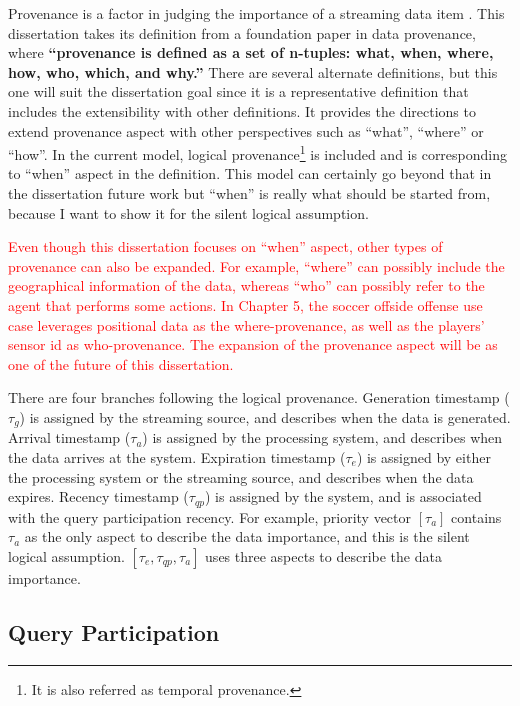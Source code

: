 Provenance is a factor in judging the importance of a streaming data item \cite{gao2010survey}.
This dissertation takes its definition from a foundation paper \cite{ram2009new} in data provenance, 
where \textbf{``provenance is defined as a set of n-tuples: what, when, where, how, who, which, and why.''}
There are several alternate definitions, but this one will suit the dissertation goal since it is a representative definition that includes the extensibility with other definitions. 
It provides the directions to extend provenance aspect with other perspectives such as ``what'', ``where'' or ``how''. 
In the current model, logical provenance\footnote{It is also referred as temporal provenance.} is included and is corresponding to ``when'' aspect in the definition.
This model can certainly go beyond that in the dissertation future work but ``when'' is really what should be started from, because I want to show it for the silent logical assumption.

\textcolor{red}{
Even though this dissertation focuses on ``when'' aspect, other types of provenance can also be expanded. 
For example, ``where'' can possibly include the geographical information of the data, whereas ``who'' can possibly refer to the agent that performs some actions. 
In Chapter 5, the soccer offside offense use case leverages positional data as the where-provenance, as well as the players' sensor id as who-provenance. 
The expansion of the provenance aspect will be as one of the future of this dissertation.}

There are four branches following the logical provenance.
Generation timestamp ($\tau_{g}$) is assigned by the streaming source, and describes when the data is generated.
Arrival timestamp ($\tau_{a}$) is assigned by the processing system, and describes when the data arrives at the system.
Expiration timestamp ($\tau_{e}$) is assigned by either the processing system or the streaming source, and describes when the data expires.
Recency timestamp ($\tau_{qp}$) is assigned by the system, and is associated with the query participation recency.
For example, priority vector $[\tau_{a}]$ contains $\tau_{a}$ as the only aspect to describe the data importance, and this is the silent logical assumption.
$[\tau_{e}, \tau_{qp}, \tau_{a}]$ uses three aspects to describe the data importance. 
%
\subsection{Query Participation}

